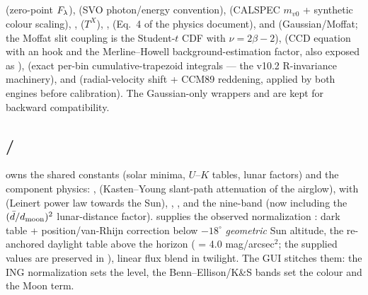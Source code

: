 \subsection{}
 (zero-point $F_\lambda$), 
(SVO photon/energy convention), 
(CALSPEC $m_{v0}$ + synthetic colour scaling), ,
 ($T^X$), ,
 (Eq.~4 of the physics document),
 and 
(Gaussian/Moffat; the Moffat slit coupling is the Student-$t$ CDF with
$\nu = 2\beta-2$),  (CCD equation with an
 hook and the Merline--Howell
 background-estimation factor, also exposed as
),  (exact
per-bin cumulative-trapezoid integrals --- the v10.2 R-invariance
machinery),  and
 (radial-velocity shift + CCM89 reddening,
applied by both engines before calibration). The Gaussian-only wrappers
 and  are kept for
backward compatibility.

\subsection{ / }
 owns the shared constants (solar minima, $U$--$K$
tables, lunar factors) and the component physics:
, 
(Kasten--Young slant-path attenuation of the airglow),
 with  (Leinert
power law towards the Sun), ,
,
 and the nine-band
 (now including the
$(\bar d/d_{\rm moon})^2$ lunar-distance factor).
 supplies the
observed normalization : dark table +
position/van-Rhijn correction below $-18^\circ$ \emph{geometric} Sun
altitude, the re-anchored daylight table above the horizon
( = 4.0 mag/arcsec$^2$; the supplied
values are preserved in ), linear flux
blend in twilight. The GUI stitches
them: the ING normalization sets the level, the Benn--Ellison/K\&S bands set
the colour and the Moon term.

